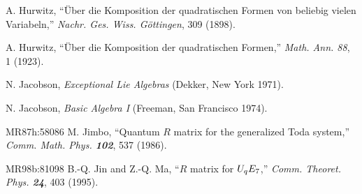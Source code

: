 

 A. Hurwitz,
     ``\"Uber die Komposition der quadratischen Formen von
    beliebig vielen Variabeln,''
    {\em Nachr. Ges. Wiss. G\"ottingen}, 309 (1898). %

 A. Hurwitz,
    ``\"Uber die Komposition der quadratischen Formen,''
    {\em Math. Ann. 88}, 1 (1923). %





 N. Jacobson,
    {\em Exceptional Lie Algebras}
    (Dekker, New York 1971).

 N. Jacobson,
        {\em Basic Algebra I}
    (Freeman, San Francisco 1974).


        {MR87h:58086}
M. Jimbo,
``Quantum {$R$} matrix for the generalized Toda system,''
{\em Comm. Math. Phys.  \bf 102}, 537 (1986).  %

        {MR98b:81098} B.-Q. Jin and Z.-Q. Ma,
    ``$R$ matrix for $U\sb qE\sb 7$,''
    {\em Comm. Theoret. Phys.  \bf 24}, 403 (1995). %

%

